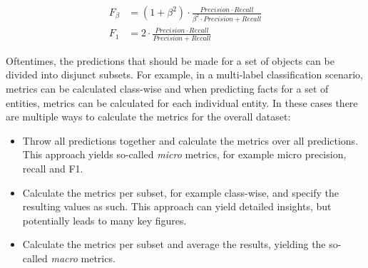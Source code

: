 \begin{align}
    F_\beta &= (1 + \beta^2) \cdot \frac{Precision \cdot Recall}{\beta^2 \cdot Precision + Recall}
    \label{eq:2_basics/4_metrics/3_prf/f_beta} \\
    F_1 &= 2 \cdot \frac{Precision \cdot Recall}{Precision + Recall}
    \label{eq:2_basics/4_metrics/3_prf/f_1}
\end{align}

Oftentimes, the predictions that should be made for a set of objects can be divided into disjunct subsets. For example, in a multi-label classification scenario, metrics can be calculated class-wise and when predicting facts for a set of entities, metrics can be calculated for each individual entity. In these cases there are multiple ways to calculate the metrics for the overall dataset:

\begin{itemize}
    \item Throw all predictions together and calculate the metrics over all predictions. This approach yields so-called \emph{micro} metrics, for example micro precision, recall and F1.

    \item Calculate the metrics per subset, for example class-wise, and specify the resulting values as such. This approach can yield detailed insights, but potentially leads to many key figures.

    \item Calculate the metrics per subset and average the results, yielding the so-called \emph{macro} metrics.
\end{itemize}
